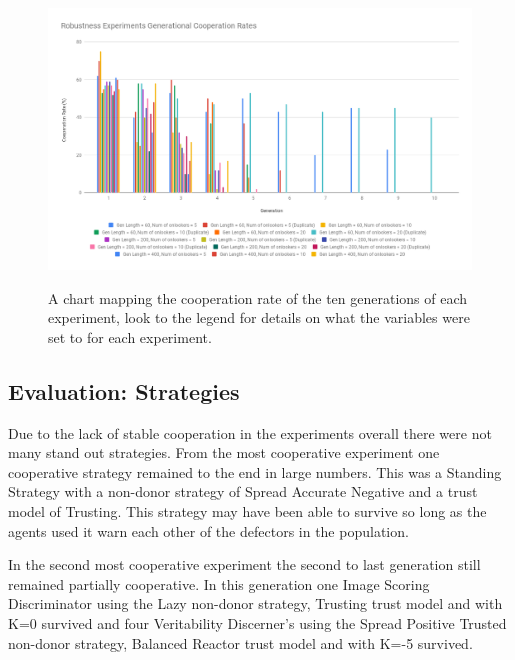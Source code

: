 \documentclass[]{final_report}
\begin{document}
\begin{figure}
\begin{framed}
	\includegraphics[width=\textwidth]{robustness_experiment1_chart.png}
	\label{fig:robustness_experiment_chart}
	\caption{A chart mapping the cooperation rate of the ten generations of each experiment, look to the legend for details on what the variables were set to for each experiment.}
\end{framed}
\end{figure}

\subsection{Evaluation: Strategies}
\label{subs:eval_strats}
Due to the lack of stable cooperation in the experiments overall there were not many stand out strategies. From the most cooperative experiment one cooperative strategy remained to the end in large numbers. This was a Standing Strategy with a non-donor strategy of Spread Accurate Negative and a trust model of Trusting. This strategy may have been able to survive so long as the agents used it warn each other of the defectors in the population.\par 
In the second most cooperative experiment the second to last generation still remained partially cooperative. In this generation one Image Scoring Discriminator using the Lazy non-donor strategy, Trusting trust model and with K=0 survived and four Veritability Discerner's using the Spread Positive Trusted non-donor strategy, Balanced Reactor trust model and with K=-5 survived.
\end{document}
